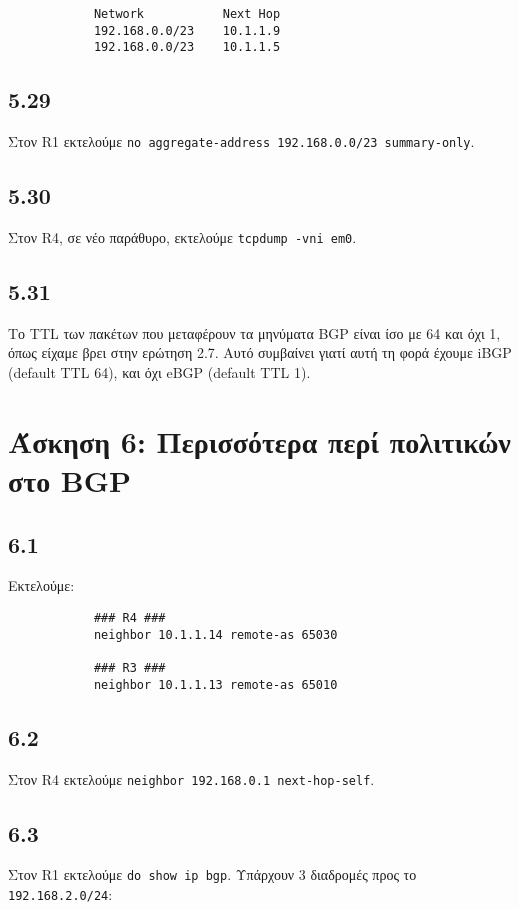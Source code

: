 \documentclass[a4paper, 12pt]{article}
\begin{document}
		\begin{verbatim}
			Network           Next Hop
			192.168.0.0/23    10.1.1.9
			192.168.0.0/23    10.1.1.5
		\end{verbatim}

	\subsection*{5.29}
		Στον R1 εκτελούμε \verb|no aggregate-address 192.168.0.0/23 summary-only|.

	\subsection*{5.30}
		Στον R4, σε νέο παράθυρο, εκτελούμε \verb|tcpdump -vni em0|.

	\subsection*{5.31} 
		Το TTL των πακέτων που μεταφέρουν τα μηνύματα BGP είναι ίσο με 64 και όχι 1, όπως είχαμε βρει στην ερώτηση 2.7. Αυτό συμβαίνει γιατί αυτή τη φορά έχουμε iBGP (default TTL 64), και όχι eBGP (default TTL 1).

\section*{Άσκηση 6: Περισσότερα περί πολιτικών στο BGP}

	\subsection*{6.1}
		Εκτελούμε:
		
		\begin{verbatim}
			### R4 ###
			neighbor 10.1.1.14 remote-as 65030
			
			### R3 ### 
			neighbor 10.1.1.13 remote-as 65010 
		\end{verbatim}

	\subsection*{6.2}
		Στον R4 εκτελούμε \verb|neighbor 192.168.0.1 next-hop-self|.

	\subsection*{6.3}
		Στον R1 εκτελούμε \verb|do show ip bgp|. Υπάρχουν 3 διαδρομές προς το \verb|192.168.2.0/24|:
		
\end{document}
